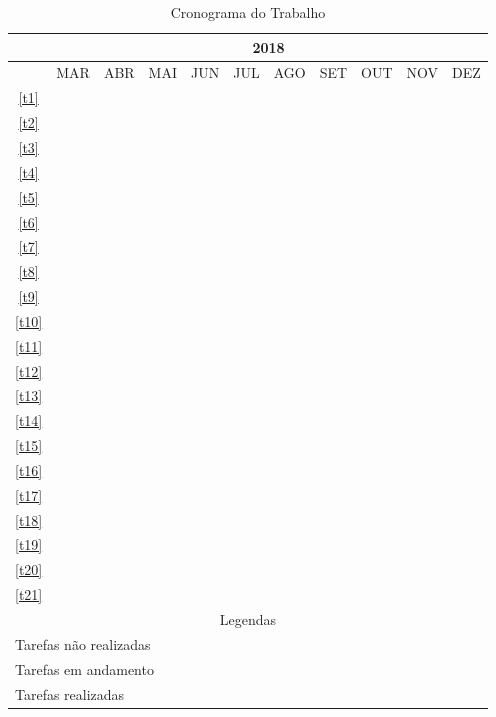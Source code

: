   \begin{table}[!htbp]
    \centering
    \caption{Cronograma do Trabalho}
    \label{tab:cronograma}
      \begin{tabular}{|c|c|c|c|c|c|c|c|c|c|c|}
      \hline
      &\multicolumn{10}{c|}{2018}\\
      \hline
      &MAR&ABR&MAI&JUN&JUL&AGO&SET&OUT&NOV&DEZ\\
      \hline
      \ref{t1}&\cellcolor{green}&&&&&&&&&\\
      \hline
      \ref{t2}&\cellcolor{green}&\cellcolor{green}&&&&&&&&\\
      \hline
      \ref{t3}&\cellcolor{green}&&&&&&&&&\\
      \hline
      \ref{t4}&\cellcolor{green}&&&&&&&&&\\
      \hline
      \ref{t5}&&\cellcolor{green}&&&&&&&&\\
      \hline
      \ref{t6}&&&\cellcolor{green}&&&&&&&\\
      \hline
      \ref{t7}&&\cellcolor{green}&\cellcolor{green}&&&&&&&\\
      \hline
      \ref{t8}&&\cellcolor{green}&&&&&&&&\\
      \hline
      \ref{t9}&&\cellcolor{green}&\cellcolor{green}&&&&&&&\\
      \hline
      \ref{t10}&&\cellcolor{green}&\cellcolor{green}&\cellcolor{green}&&&&&&\\
      \hline
      \ref{t11}&&&&\cellcolor{yellow}&\cellcolor{yellow}&&&&&\\
      \hline
      \ref{t12}&&&&&\cellcolor{red}&\cellcolor{red}&&&&\\
      \hline
      \ref{t13}&&&&&\cellcolor{red}&\cellcolor{red}&&&&\\
      \hline
      \ref{t14}&&&&&\cellcolor{red}&\cellcolor{red}&&&&\\
      \hline
      \ref{t15}&&&&&\cellcolor{red}&\cellcolor{red}&&&&\\
      \hline
      \ref{t16}&&&&&\cellcolor{red}&\cellcolor{red}&&&&\\
      \hline
      \ref{t17}&&&&&&\cellcolor{red}&&&&\\
      \hline
      \ref{t18}&&&&&&\cellcolor{red}&\cellcolor{red}&&&\\
      \hline
      \ref{t19}&&&&&&&\cellcolor{red}&\cellcolor{red}&&\\
      \hline
      \ref{t20}&&&&&&&&\cellcolor{red}&\cellcolor{red}&\\
      \hline
      \ref{t21}&&&&&&&&\cellcolor{red}&\cellcolor{red}&\cellcolor{red}\\
      \hline
      \multicolumn{11}{|c|}{Legendas}\\ \hline
      \multicolumn{10}{|l|}{Tarefas não realizadas} &\cellcolor{red}\\
      \hline
      \multicolumn{10}{|l|}{Tarefas em andamento} &\cellcolor{yellow}\\
      \hline
      \multicolumn{10}{|l|}{Tarefas realizadas}&\cellcolor{green}\\
      \hline
      \end{tabular}
  \end{table}

